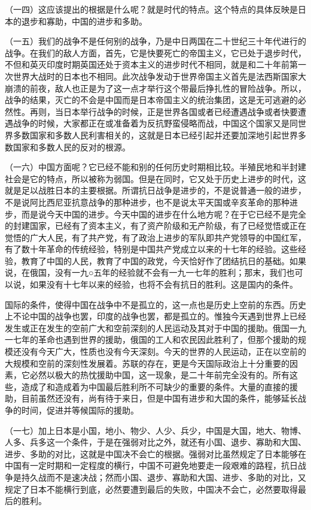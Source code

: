 \documentclass[UTF8, 12pt, a4paper]{ctexrep}
\begin{document}
（一四）这应该提出的根据是什么呢？就是时代的特点。这个特点的具体反映是日本的退步和寡助，中国的进步和多助。

（一五）我们的战争不是任何别的战争，乃是中日两国在二十世纪三十年代进行的战争。在我们的敌人方面，首先，它是快要死亡的帝国主义，它已处于退步时代，不但和英灭印度时期英国还处于资本主义的进步时代不相同，就是和二十年前第一次世界大战时的日本也不相同。此次战争发动于世界帝国主义首先是法西斯国家大崩溃的前夜，敌人也正是为了这一点才举行这个带最后挣扎性的冒险战争。所以，战争的结果，灭亡的不会是中国而是日本帝国主义的统治集团，这是无可逃避的必然性。再则，当日本举行战争的时候，正是世界各国或者已经遭遇战争或者快要遭遇战争的时候，大家都正在或准备着为反抗野蛮侵略而战，中国这个国家又是同世界多数国家和多数人民利害相关的，这就是日本已经引起并还要加深地引起世界多数国家和多数人民的反对的根源。

（一六）中国方面呢？它已经不能和别的任何历史时期相比较。半殖民地和半封建社会是它的特点，所以被称为弱国。但是在同时，它又处于历史上进步的时代，这就是足以战胜日本的主要根据。所谓抗日战争是进步的，不是说普通一般的进步，不是说阿比西尼亚抗意战争的那种进步，也不是说太平天国或辛亥革命的那种进步，而是说今天中国的进步。今天中国的进步在什么地方呢？在于它已经不是完全的封建国家，已经有了资本主义，有了资产阶级和无产阶级，有了已经觉悟或正在觉悟的广大人民，有了共产党，有了政治上进步的军队即共产党领导的中国红军，有了数十年革命的传统经验，特别是中国共产党成立以来的十七年的经验。这些经验，教育了中国的人民，教育了中国的政党，今天恰好作了团结抗日的基础。如果说，在俄国，没有一九○五年的经验就不会有一九一七年的胜利；那末，我们也可以说，如果没有十七年以来的经验，也将不会有抗日的胜利。这是国内的条件。

国际的条件，使得中国在战争中不是孤立的，这一点也是历史上空前的东西。历史上不论中国的战争也罢，印度的战争也罢，都是孤立的。惟独今天遇到世界上已经发生或正在发生的空前广大和空前深刻的人民运动及其对于中国的援助。俄国一九一七年的革命也遇到世界的援助，俄国的工人和农民因此胜利了，但那个援助的规模还没有今天广大，性质也没有今天深刻。今天的世界的人民运动，正在以空前的大规模和空前的深刻性发展着。苏联的存在，更是今天国际政治上十分重要的因素，它必然以极大的热忱援助中国，这一现象，是二十年前完全没有的。所有这些，造成了和造成着为中国最后胜利所不可缺少的重要的条件。大量的直接的援助，目前虽然还没有，尚有待于来日，但是中国有进步和大国的条件，能够延长战争的时间，促进并等候国际的援助。

（一七）加上日本是小国，地小、物少、人少、兵少，中国是大国，地大、物博、人多、兵多这一个条件，于是在强弱对比之外，就还有小国、退步、寡助和大国、进步、多助的对比，这就是中国决不会亡的根据。强弱对比虽然规定了日本能够在中国有一定时期和一定程度的横行，中国不可避免地要走一段艰难的路程，抗日战争是持久战而不是速决战；然而小国、退步、寡助和大国、进步、多助的对比，又规定了日本不能横行到底，必然要遭到最后的失败，中国决不会亡，必然要取得最后的胜利。
\end{document}
